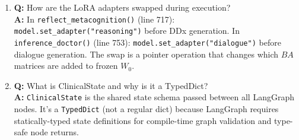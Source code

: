 \begin{vivabox}[\textcolor{white}{Likely Viva Questions}]
\begin{enumerate}
    \item \textbf{Q:} How are the LoRA adapters swapped during execution?\\
    \textbf{A:} In \texttt{reflect\_metacognition()} (line 717): \texttt{model.set\_adapter("reasoning")} before DDx generation. In \texttt{inference\_doctor()} (line 753): \texttt{model.set\_adapter("dialogue")} before dialogue generation. The swap is a pointer operation that changes which $BA$ matrices are added to frozen $W_0$.

    \item \textbf{Q:} What is ClinicalState and why is it a TypedDict?\\
    \textbf{A:} \texttt{ClinicalState} is the shared state schema passed between all LangGraph nodes. It's a \texttt{TypedDict} (not a regular dict) because LangGraph requires statically-typed state definitions for compile-time graph validation and type-safe node returns.
\end{enumerate}
\end{vivabox}
